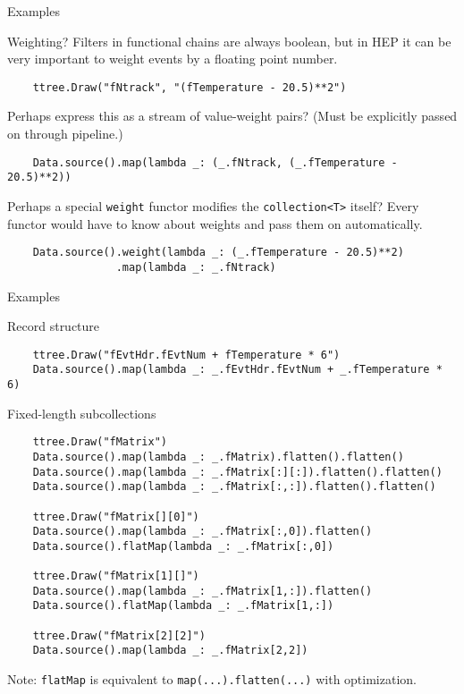 \documentclass{beamer}
\begin{document}
\begin{frame}[fragile]{Examples}
\begin{block}{Weighting?}
Filters in functional chains are always boolean, but in HEP it can be very important to weight events by a floating point number.

{\scriptsize \begin{verbatim}
    ttree.Draw("fNtrack", "(fTemperature - 20.5)**2")
\end{verbatim}}

Perhaps express this as a stream of value-weight pairs? (Must be explicitly passed on through pipeline.)

{\scriptsize \begin{verbatim}
    Data.source().map(lambda _: (_.fNtrack, (_.fTemperature - 20.5)**2))
\end{verbatim}}

Perhaps a special {\tt weight} functor modifies the {\tt collection<T>} itself? Every functor would have to know about weights and pass them on automatically.

{\scriptsize \begin{verbatim}
    Data.source().weight(lambda _: (_.fTemperature - 20.5)**2)
                 .map(lambda _: _.fNtrack)
\end{verbatim}}
\end{block}
\end{frame}

\begin{frame}[fragile]{Examples}
\begin{block}{Record structure}
\vspace{-0.5\baselineskip}
{\scriptsize \begin{verbatim}
    ttree.Draw("fEvtHdr.fEvtNum + fTemperature * 6")
    Data.source().map(lambda _: _.fEvtHdr.fEvtNum + _.fTemperature * 6)
\end{verbatim}}
\vspace{-0.5\baselineskip}
\end{block}

\begin{block}{Fixed-length subcollections}
\vspace{-0.5\baselineskip}
{\scriptsize \begin{verbatim}
    ttree.Draw("fMatrix")
    Data.source().map(lambda _: _.fMatrix).flatten().flatten()
    Data.source().map(lambda _: _.fMatrix[:][:]).flatten().flatten()
    Data.source().map(lambda _: _.fMatrix[:,:]).flatten().flatten()

    ttree.Draw("fMatrix[][0]")
    Data.source().map(lambda _: _.fMatrix[:,0]).flatten()
    Data.source().flatMap(lambda _: _.fMatrix[:,0])

    ttree.Draw("fMatrix[1][]")
    Data.source().map(lambda _: _.fMatrix[1,:]).flatten()
    Data.source().flatMap(lambda _: _.fMatrix[1,:])

    ttree.Draw("fMatrix[2][2]")
    Data.source().map(lambda _: _.fMatrix[2,2])
\end{verbatim}}
\vspace{-0.5\baselineskip}
Note: {\tt flatMap} is equivalent to {\tt map(...).flatten(...)} with optimization.
\end{block}
\end{frame}
\end{document}
